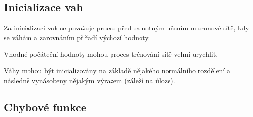 \subsection{Inicializace vah}

\begin{compactitem}
    \item Za inicializaci vah se považuje proces před samotným učením neuronové sítě, kdy se váhám a zarovnáním přiřadí výchozí hodnoty.

    \item Vhodné počáteční hodnoty mohou proces trénování sítě velmi urychlit.

    \item Váhy mohou být inicializovány na základě nějakého normálního rozdělení a následně vynásobeny nějakým výrazem (záleží na úloze).
\end{compactitem}

\subsection{Chybové funkce}

